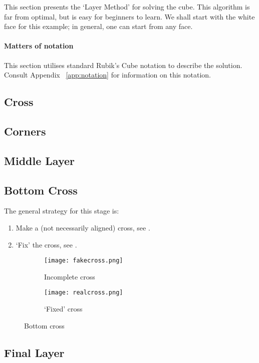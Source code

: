 This section presents the `Layer Method' for solving the cube. This algorithm is far from optimal, but is easy for beginners to learn. We shall start with the white face for this example; in general, one can start from any face.

\paragraph{Matters of notation} This section utilises standard Rubik's Cube notation to describe the solution. Consult Appendix ~\ref{app:notation} for information on this notation.

\subsection{Cross}


\subsection{Corners}


\subsection{Middle Layer}


\subsection{Bottom Cross}
The general strategy for this stage is:\begin{enumerate}
	\item Make a (not necessarily aligned) cross, see .
	\item `Fix' the cross, see .
\end{enumerate}
\begin{figure}[h]
	\centering
	\begin{subfigure}[b]{0.3\textwidth}
		\texttt{[image: fakecross.png]}
		\caption{Incomplete cross}\label{fig:fakecross}
	\end{subfigure}
	\begin{subfigure}[b]{0.3\textwidth}
		\texttt{[image: realcross.png]}
		\caption{`Fixed' cross}\label{fig:realcross}
	\end{subfigure}
	\caption{Bottom cross}
\end{figure}


\subsection{Final Layer}